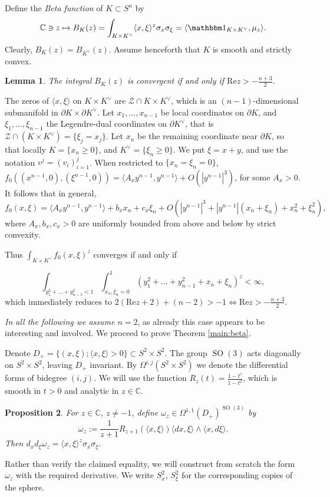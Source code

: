 \documentclass[reqno,10pt]{amsart}
\newcounter{mp}
\newtheorem{Proposition}{Proposition}[section]
\newtheorem{Lemma}[Proposition]{Lemma}
\renewcommand{\Re}{\mathrm {Re}}
\DeclareMathOperator{\SO}{SO}
\newcommand{\C}{\mathbb{C}}
\begin{document}
Define the \emph{Beta function} of $K\subset S^n$ by 
\[\C\ni z\mapsto B_K(z)=\int_{K\times K^\vee}\langle x,\xi\rangle ^z\sigma_x\sigma_\xi =\langle  \mathbbm1_{K\times K^\vee}, \mu_z\rangle. \]
Clearly, $B_K(z)=B_{K^\vee}(z)$. Assume henceforth that $K$ is smooth and strictly convex. 
\begin{Lemma}\label{lem:convergence_domain}
	The integral $B_K(z)$ is convergent if and only if $\mathrm{Re} z>-\frac{n+3}{2}$.
\end{Lemma}
\proof
The zeros of $\langle x,\xi\rangle $ on $K\times K^\vee$ are $\mathcal Z\cap K\times K^\vee$, which is an $(n-1)$-dimensional submanifold in $\partial K\times\partial K^\vee$. Let $x_1,\dots,x_{n-1}$ be local coordinates on $\partial K$, and $\xi_1,\dots, \xi_{n-1}$ the Legendre-dual coordinates on $\partial K^\vee$, that is $\mathcal Z\cap (K\times K^\vee)=\{\xi_j=x_j\}$. Let $x_n$ be the remaining coordinate near $\partial K$, so that locally $ K=\{x_n\geq 0\}$, and $K^\vee=\{\xi_n\geq 0\}$.
We put $\xi=x+y$, and use the notation $v^j=(v_i)_{i=1}^{j}$. When restricted to $\{x_n=\xi_n=0\}$, $f_0( (x^{n-1},0), (\xi^{n-1},0)) =\langle A_x y^{n-1}, y^{n-1}\rangle+O(|y^{n-1}|^3)$, for some $A_x>0$. It follows that in general, $$f_0(x,\xi)=\langle A_{x}y^{n-1}, y^{n-1}\rangle+b_xx_n+c_x\xi_n +O(|y^{n-1}|^3+|y^{n-1}|(x_n+\xi_n)+x_n^2+\xi_n^2),$$ where $A_x, b_x, c_x>0$ are uniformly bounded from above and below by strict convexity.

Thus $\int_{K\times K^\vee} f_0(x,\xi)^z$ converges if and only if

\[\int_{y_1^2+\dots+y_{n-1}^2<1}\int_{x_n, \xi_{n}=0}^1 ( y_1^2+\dots+y_{n-1}^2+x_n+\xi_{n})^z<\infty,  \]
which immediately reduces to $2(\mathrm{Re}z+2)+(n-2)>-1\iff \Re z>-\frac{n+3}{2}$.
\endproof




\emph{In all  the following we assume $n=2$}, as already this case appears to be interesting and involved. We proceed to prove Theorem \ref{main:beta}.

Denote $D_+=\{(x,\xi); \langle x,\xi\rangle> 0\}\subset S^2\times S^2$. The group $\SO(3)$ acts diagonally on $S^2\times S^2$, leaving $D_+$ invariant. By $\Omega^{i,j}(S^2\times S^2)$ we denote the differential forms of bidegree $(i,j)$. We will use the function $R_z(t)=\frac{1-t^{z}}{1-t^2}$, which is smooth in $t>0$ and analytic in $z\in\mathbb C$.


\begin{Proposition}\label{prop:primitive} For $z\in \C$, $z\neq -1$, define $\omega_z\in{ \Omega^{1,1}(D_+)^{\SO(3)}  }$  by \[\omega_z:=\frac{1}{z+1}R_{z+1}(\langle x,\xi\rangle)\langle dx,\xi\rangle\wedge \langle x, d\xi\rangle.\]
	Then $d_xd_\xi\omega_z=\langle x,\xi\rangle^z \sigma_x\sigma_\xi$.
\end{Proposition}
\proof
Rather than verify the claimed equality, we will construct from scratch the form $\omega_z$ with the required derivative. We write $S^2_x$, $S^2_\xi$ for the corresponding copies of the sphere.
\end{document}
